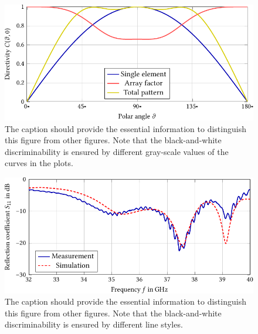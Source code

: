 \begin{figure}[tp]
    \centering
    \includegraphics{./Figures/Fig_2__Array_radchar/Fig_2__Array_radchar.pdf}
    \caption{The caption should provide the essential information to distinguish this figure from other figures. 
        Note that the black-and-white discriminability is ensured by different gray-scale values of the curves in the plots.}
    \label{fig:samplefigure2}
\end{figure}%

\begin{figure}[tp]
    \centering
    \includegraphics{./Figures/Fig_3__measure_dB/Fig_3__measure_dB.pdf}
    \caption{The caption should provide the essential information to distinguish this figure from other figures. 
        Note that the black-and-white discriminability is ensured by different line styles.}
    \label{fig:samplefigure3}
\end{figure}%

